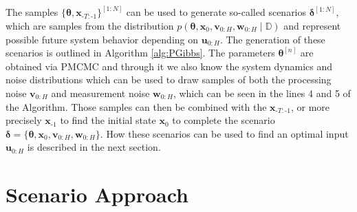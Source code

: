 The samples $\{\boldsymbol{\theta}, \boldsymbol{x}_{\text{-}T:\text{-}1}\}^{[1:N]}$ can be used to generate so-called scenarios $\boldsymbol{\delta}^{[1:N]}$, which are samples from the distribution $p(\boldsymbol{\theta}, \boldsymbol{x}_0, \boldsymbol{v}_{0:H}, \boldsymbol{w}_{0:H} \mid \mathbb{D})$ and represent possible future system behavior depending on $\boldsymbol{u}_{0:H}$. The generation of these scenarios is outlined in Algorithm \ref{alg:PGibbs}. The parameters $\boldsymbol{\theta}^{[n]}$ are obtained via PMCMC and through it we also know the system dynamics and noise distributions which can be used to draw samples of both the processing noise $\boldsymbol{v}_{0:H}$ and measurement noise $\boldsymbol{w}_{0:H}$, which can be seen in the lines 4 and 5 of the Algorithm. Those samples can then be combined with the $\boldsymbol{x}_{\text{-}T:\text{-}1}$, or more precisely $\boldsymbol{x}_{\text{-}1}$ to find the initial state $\boldsymbol{x}_{0}$ to complete the scenario $\boldsymbol{\delta} = \{ \boldsymbol{\theta}, \boldsymbol{x}_0, \boldsymbol{v}_{0:H}, \boldsymbol{w}_{0:H}\}$. How these scenarios can be used to find an optimal input $\boldsymbol{u}_{0:H}$ is described in the next section.


\section{Scenario Approach} \label{Scenario Approach}



